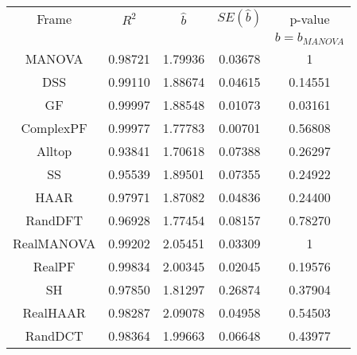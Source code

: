 \begin{tabular}{|c|c|c|c|c|}\hline 
Frame & $R^2$& $\hat{b}$ & $SE(\hat{b})$ & p-value \\
 & & & & $b=b_{MANOVA}$\\ \hline 
MANOVA & 0.98721 & 1.79936 & 0.03678 & 1 \\ 
DSS & 0.99110 & 1.88674 & 0.04615 & 0.14551 \\ 
GF & 0.99997 & 1.88548 & 0.01073 & 0.03161  \\ 
ComplexPF & 0.99977 & 1.77783 & 0.00701 & 0.56808  \\ 
Alltop & 0.93841 & 1.70618 & 0.07388 & 0.26297  \\ 
SS & 0.95539 & 1.89501 & 0.07355 & 0.24922  \\ 
\hline 
HAAR & 0.97971 & 1.87082 & 0.04836 & 0.24400  \\ 
RandDFT & 0.96928 & 1.77454 & 0.08157 & 0.78270  \\ 
\hline 
\hline 
RealMANOVA & 0.99202 & 2.05451 & 0.03309 & 1 \\ 
RealPF & 0.99834 & 2.00345 & 0.02045 & 0.19576  \\ 
SH & 0.97850 & 1.81297 & 0.26874 & 0.37904  \\ 
\hline 
RealHAAR & 0.98287 & 2.09078 & 0.04958 & 0.54503  \\ 
RandDCT & 0.98364 & 1.99663 & 0.06648 & 0.43977  \\ 
\hline 
\end{tabular}
